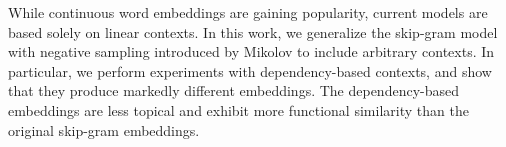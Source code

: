While continuous word embeddings are gaining popularity, current models are based solely on linear contexts. In this work, we generalize the skip-gram model with negative sampling introduced by Mikolov \etal{\textasciitilde} to include arbitrary contexts. In particular, we perform experiments with dependency-based contexts, and show that they produce markedly different embeddings. The dependency-based embeddings are less topical and exhibit more functional similarity than the original skip-gram embeddings.
